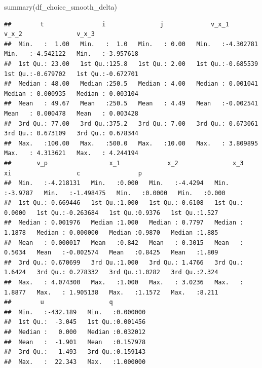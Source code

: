 \documentclass[
]{book}
\newenvironment{Shaded}{\begin{snugshade}}{\end{snugshade}}
\newcommand{\FunctionTok}[1]{\textcolor[rgb]{0.00,0.00,0.00}{#1}}
\newcommand{\NormalTok}[1]{#1}
\newcommand{\SpecialCharTok}[1]{\textcolor[rgb]{0.00,0.00,0.00}{#1}}
\begin{document}
\begin{Shaded}
\begin{Highlighting}[]
\FunctionTok{summary}\NormalTok{(df\_choice\_smooth\_delta)}
\end{Highlighting}
\end{Shaded}

\begin{verbatim}
##        t                i               j             v_x_1               v_x_2               v_x_3          
##  Min.   :  1.00   Min.   :  1.0   Min.   : 0.00   Min.   :-4.302781   Min.   :-4.542122   Min.   :-3.957618  
##  1st Qu.: 23.00   1st Qu.:125.8   1st Qu.: 2.00   1st Qu.:-0.685539   1st Qu.:-0.679702   1st Qu.:-0.672701  
##  Median : 48.00   Median :250.5   Median : 4.00   Median : 0.001041   Median : 0.000935   Median : 0.003104  
##  Mean   : 49.67   Mean   :250.5   Mean   : 4.49   Mean   :-0.002541   Mean   : 0.000478   Mean   : 0.003428  
##  3rd Qu.: 77.00   3rd Qu.:375.2   3rd Qu.: 7.00   3rd Qu.: 0.673061   3rd Qu.: 0.673109   3rd Qu.: 0.678344  
##  Max.   :100.00   Max.   :500.0   Max.   :10.00   Max.   : 3.809895   Max.   : 4.313621   Max.   : 4.244194  
##       v_p                 x_1             x_2               x_3                xi                  c                p        
##  Min.   :-4.218131   Min.   :0.000   Min.   :-4.4294   Min.   :-3.9787   Min.   :-1.498475   Min.   :0.0000   Min.   :0.000  
##  1st Qu.:-0.669446   1st Qu.:1.000   1st Qu.:-0.6108   1st Qu.: 0.0000   1st Qu.:-0.263684   1st Qu.:0.9376   1st Qu.:1.527  
##  Median : 0.001976   Median :1.000   Median : 0.7797   Median : 1.1878   Median : 0.000000   Median :0.9870   Median :1.885  
##  Mean   : 0.000017   Mean   :0.842   Mean   : 0.3015   Mean   : 0.5034   Mean   :-0.002574   Mean   :0.8425   Mean   :1.809  
##  3rd Qu.: 0.670699   3rd Qu.:1.000   3rd Qu.: 1.4766   3rd Qu.: 1.6424   3rd Qu.: 0.278332   3rd Qu.:1.0282   3rd Qu.:2.324  
##  Max.   : 4.074300   Max.   :1.000   Max.   : 3.0236   Max.   : 1.8877   Max.   : 1.905138   Max.   :1.1572   Max.   :8.211  
##        u                  q           
##  Min.   :-432.189   Min.   :0.000000  
##  1st Qu.:  -3.045   1st Qu.:0.001456  
##  Median :   0.000   Median :0.032012  
##  Mean   :  -1.901   Mean   :0.157978  
##  3rd Qu.:   1.493   3rd Qu.:0.159143  
##  Max.   :  22.343   Max.   :1.000000
\end{verbatim}

\begin{Shaded}
\end{Shaded}
\end{document}
